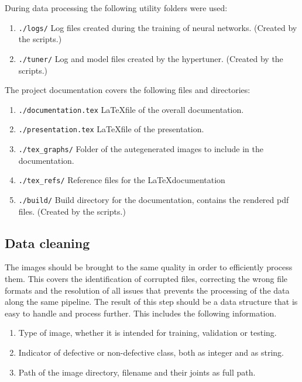 \documentclass[10pt, final]{article}
\begin{document}
\noindent
During data processing the following utility folders were used:

\begin{enumerate}
	\item \lstinline{./logs/} Log files created during the training of neural networks. (Created by the scripts.)
	\item \lstinline{./tuner/} Log and model files created by the hypertuner. (Created by the scripts.)
\end{enumerate}

\noindent
The project documentation covers the following files and directories:

\begin{enumerate}
	\item \lstinline{./documentation.tex} \LaTeX file of the overall documentation.
	\item \lstinline{./presentation.tex} \LaTeX file of the presentation.
	\item \lstinline{./tex_graphs/} Folder of the autegenerated images to include in the documentation.
	\item \lstinline{./tex_refs/} Reference files for the \LaTeX documentation
	\item \lstinline{./build/} Build directory for the documentation, contains the rendered pdf files. (Created by the scripts.)
\end{enumerate}

\subsection{Data cleaning}
The images should be brought to the same quality in order to efficiently process them.
This covers the identification of corrupted files, correcting the wrong file formats
and the resolution of all issues that prevents the processing of the data along the same pipeline.
The result of this step should be a data structure that is easy to handle and process further.
This includes the following information.
\begin{enumerate}
	\item Type of image, whether it is intended for training, validation or testing.
	\item Indicator of defective or non-defective class, both as integer and as string.
	\item Path of the image directory, filename and their joints as full path.
\end{enumerate}
\end{document}
